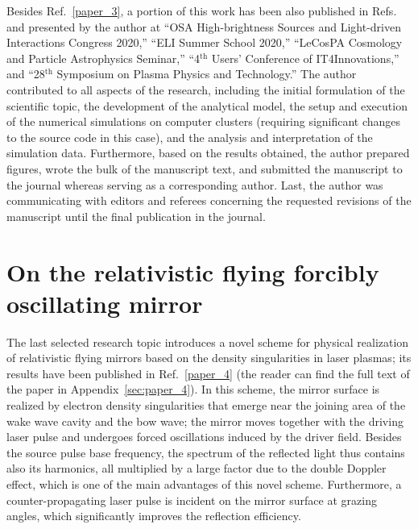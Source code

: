 \documentclass[10pt, a4paper, twoside, openright]{report}
\newcommand{\q}[1]{``#1''} %
\begin{document}
Besides Ref.~\ref{paper_3}, a portion of this work has been also published in Refs.~ and presented by the author at \q{OSA High-brightness Sources and Light-driven Interactions Congress 2020,} \q{ELI Summer School 2020,} \q{LeCosPA Cosmology and Particle Astrophysics Seminar,} \q{4$ ^{\mathrm{th}} $ Users' Conference of IT4Innovations,} and \q{28$ ^{\mathrm{th}} $ Symposium on Plasma Physics and Technology.} The author contributed to all aspects of the research, including the initial formulation of the scientific topic, the development of the analytical model, the setup and execution of the numerical simulations on computer clusters (requiring significant changes to the source code in this case), and the analysis and interpretation of the simulation data. Furthermore, based on the results obtained, the author prepared figures, wrote the bulk of the manuscript text, and submitted the manuscript to the journal whereas serving as a corresponding author. Last, the author was communicating with editors and referees concerning the requested revisions of the manuscript until the final publication in the journal.


\section{On the relativistic flying forcibly oscillating mirror\label{sec:on_the_relativistic_flying_forcibly_oscillating_mirror}}
%

The last selected research topic introduces a novel scheme for physical realization of relativistic flying mirrors based on the density singularities in laser plasmas; its results have been published in Ref.~\ref{paper_4} (the reader can find the full text of the paper in Appendix~\ref{sec:paper_4}). In this scheme, the mirror surface is realized by electron density singularities that emerge near the joining area of the wake wave cavity and the bow wave; the mirror moves together with the driving laser pulse and undergoes forced oscillations induced by the driver field. Besides the source pulse base frequency, the spectrum of the reflected light thus contains also its harmonics, all multiplied by a large factor due to the double Doppler effect, which is one of the main advantages of this novel scheme. Furthermore, a counter-propagating laser pulse is incident on the mirror surface at grazing angles, which significantly improves the reflection efficiency.
\end{document}
